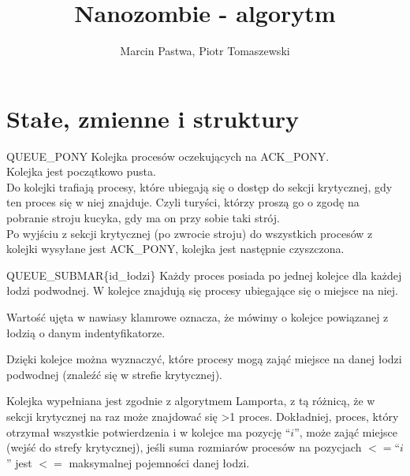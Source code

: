 \documentclass{beamer}
\title[Nanozombie]{Nanozombie - algorytm}
\author{Marcin Pastwa, Piotr Tomaszewski}
\date{}
\begin{document}
\begin{frame}
  \titlepage
\end{frame}

\section{Stałe, zmienne i struktury}

\begin{frame}{QUEUE\_PONY}
\internallinenumbers
    \resetlinenumber[1]
    Kolejka procesów oczekujących na ACK\_PONY. \\
    Kolejka jest początkowo pusta. \\
    Do kolejki trafiają procesy, które ubiegają się o dostęp do sekcji krytycznej, gdy ten proces się w niej znajduje. Czyli turyści, którzy proszą go o zgodę na pobranie stroju kucyka, gdy ma on przy sobie taki strój. \\
    Po wyjściu z sekcji krytycznej (po zwrocie stroju) do wszystkich procesów z kolejki wysyłane jest ACK\_PONY, kolejka jest następnie czyszczona.
\end{frame}

\begin{frame}{QUEUE\_SUBMAR\{id\_łodzi\}}
    \internallinenumbers
    \resetlinenumber[1]
    Każdy proces posiada po jednej kolejce dla każdej łodzi podwodnej.
    W kolejce znajdują się procesy ubiegające się o miejsce na niej.

    \vspace{0.2cm}
    Wartość ujęta w nawiasy klamrowe oznacza, że mówimy o kolejce powiązanej z łodzią o danym indentyfikatorze.

    \vspace{0.2cm}
    Dzięki kolejce można wyznaczyć, które procesy mogą zająć miejsce na danej łodzi podwodnej (znaleźć się w strefie krytycznej).

    \vspace{0.2cm}
    Kolejka wypełniana jest zgodnie z algorytmem Lamporta, z tą różnicą, że w sekcji krytycznej na raz może znajdować się >1 proces. Dokładniej, proces, który otrzymał wszystkie potwierdzenia i w kolejce ma pozycję ``$i$'', może zająć miejsce (wejść do strefy krytycznej), jeśli suma rozmiarów procesów na pozycjach $<=$``$i$'' jest $<=$ maksymalnej pojemności danej łodzi.
\end{frame}
\end{document}
